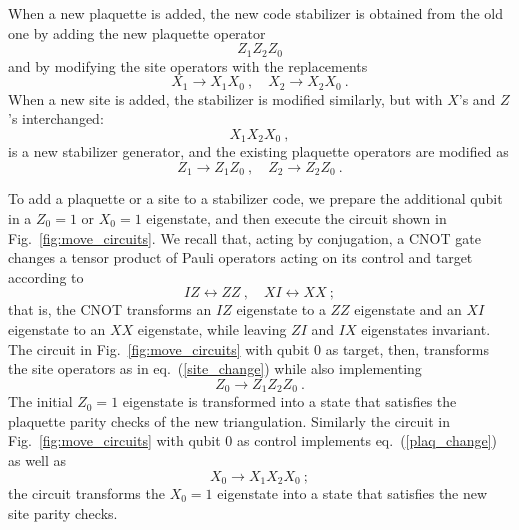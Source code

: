When a new plaquette is added, the new code stabilizer is obtained
from the old one by adding the new plaquette operator
\begin{equation}
Z_1 Z_2 Z_0
\end{equation}
and by modifying the site operators with the replacements
\begin{equation}
\label{site_change}
X_1 \to X_1 X_0~, \quad X_2\to X_2 X_0~.
\end{equation}
When a new site is added, the stabilizer is modified similarly, but with
$X$'s and $Z$'s interchanged:
\begin{equation}
 X_1 X_2 X_0 ~,
\end{equation}
is a new stabilizer generator, and the existing plaquette operators are modified as
\begin{equation}
\label{plaq_change}
Z_1 \to Z_1 Z_0~, \quad Z_2\to Z_2 Z_0~.
\end{equation}

To add a plaquette or a site to a stabilizer code, we prepare the additional
qubit in a $Z_0=1$ or $X_0=1$ eigenstate, and then execute the circuit shown
in Fig.~\ref{fig:move_circuits}.
We recall that, acting by conjugation, a CNOT gate changes a tensor
product of Pauli operators acting on its control and target according to
\begin{equation}
IZ \leftrightarrow ZZ~,\quad XI \leftrightarrow XX~;
\end{equation}
that is, the CNOT transforms an
$IZ$ eigenstate to a $ZZ$ eigenstate and an $XI$ eigenstate to an $XX$ eigenstate, while leaving $ZI$ and $IX$ eigenstates
invariant. The circuit in Fig.~\ref{fig:move_circuits} with qubit 0 as target,
then, transforms the site operators as in eq.~(\ref{site_change}) while
also implementing
\begin{equation}
Z_0\to Z_1 Z_2 Z_0~.
\end{equation}
The initial $Z_0=1$ eigenstate is transformed into a state that satisfies the
plaquette parity checks of the new triangulation.   Similarly the circuit in
Fig.~\ref{fig:move_circuits} with qubit 0 as control implements
eq.~(\ref{plaq_change}) as well as
\begin{equation}
X_0\to X_1 X_2 X_0~;
\end{equation}
the circuit transforms the $X_0=1$ eigenstate into a state that satisfies the
new site parity checks.

